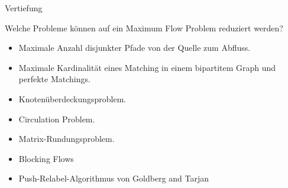 \documentclass[aspectratio=169]{beamer}
\begin{document}
  \begin{frame}{Vertiefung}

  \begin{anwendungen*}
    Welche Probleme können auf ein Maximum Flow Problem reduziert werden?
    \begin{itemize}
      \item Maximale Anzahl disjunkter Pfade von der Quelle zum Abfluss.
      \item Maximale Kardinalität eines Matching in einem bipartitem Graph und perfekte Matchings.
      \item Knotenüberdeckungsproblem.
      \item Circulation Problem.
      \item Matrix-Rundungsproblem.
    \end{itemize}

  \end{anwendungen*}

  \pause

  \begin{algorithmen*}
  \begin{itemize}
    \item Blocking Flows
    \item Push-Relabel-Algorithmus von Goldberg and Tarjan
  \end{itemize}

  \end{algorithmen*}



  \end{frame}
\end{document}
